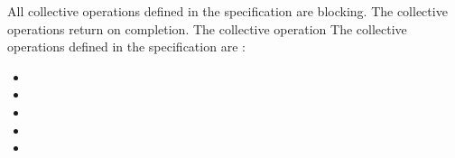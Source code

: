 All collective operations defined in the specification are blocking. The 
collective operations return on completion. The collective operation 
The collective operations defined in the \openshmem{} specification 
are :

\begin{itemize}
\item[] \broadcast{} 
\item[] \barrier{}
\item[] \barrierall{}
\item[] \collect{}
\item[] \reduction{} 
\end{itemize} 